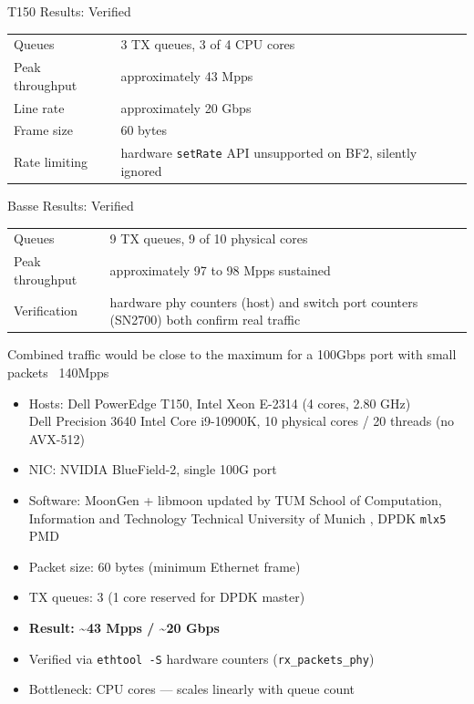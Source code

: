 \documentclass[Screen16to9,17pt]{foils}
\begin{document}

T150 Results: Verified\\
\begin{tabularx}{\textwidth}{lX}
Queues & 3 TX queues, 3 of 4 CPU cores \\
Peak throughput & approximately 43 Mpps \\
Line rate & approximately 20 Gbps \\
Frame size & 60 bytes \\
Rate limiting & hardware \verb+setRate+ API unsupported on BF2, silently ignored \\
\end{tabularx}

Basse Results: Verified\\
\begin{tabularx}{\textwidth}{lX}
Queues & 9 TX queues, 9 of 10 physical cores \\
Peak throughput & approximately 97 to 98 Mpps sustained \\
Verification & hardware phy counters (host) and switch port counters (SN2700) both confirm real traffic \\
\end{tabularx}

Combined traffic would be close to the maximum for a 100Gbps port with small packets ~140Mpps


\begin{itemize}
\item Hosts: Dell PowerEdge T150, Intel Xeon E-2314 (4 cores, 2.80 GHz)\\
 Dell Precision 3640
Intel Core i9-10900K, 10 physical cores / 20 threads (no AVX-512)
\item NIC: NVIDIA BlueField-2, single 100G port
\item Software: MoonGen + libmoon updated by TUM School of Computation, Information and Technology
Technical University of Munich
, DPDK \verb+mlx5+ PMD
\item Packet size: 60 bytes (minimum Ethernet frame)
\item TX queues: 3 (1 core reserved for DPDK master)
\item \textbf{Result: \textasciitilde{}43 Mpps / \textasciitilde{}20 Gbps}
\item Verified via \verb+ethtool -S+ hardware counters (\verb+rx_packets_phy+)
\item Bottleneck: CPU cores — scales linearly with queue count
\end{itemize}
\end{document}
